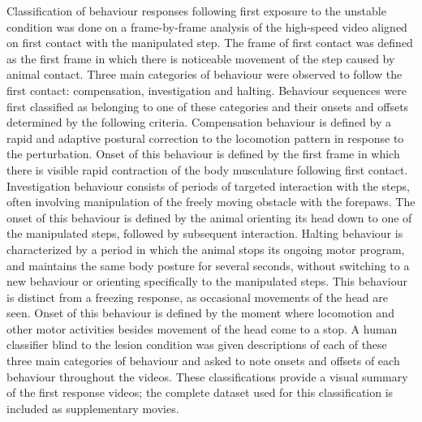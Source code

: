 Classification of behaviour responses following first exposure to the unstable condition was done on a frame-by-frame analysis of the high-speed video aligned on first contact with the manipulated step. The frame of first contact was defined as the first frame in which there is noticeable movement of the step caused by animal contact. Three main categories of behaviour were observed to follow the first contact: compensation, investigation and halting. Behaviour sequences were first classified as belonging to one of these categories and their onsets and offsets determined by the following criteria. Compensation behaviour is defined by a rapid and adaptive postural correction to the locomotion pattern in response to the perturbation. Onset of this behaviour is defined by the first frame in which there is visible rapid contraction of the body musculature following first contact. Investigation behaviour consists of periods of targeted interaction with the steps, often involving manipulation of the freely moving obstacle with the forepaws. The onset of this behaviour is defined by the animal orienting its head down to one of the manipulated steps, followed by subsequent interaction. Halting behaviour is characterized by a period in which the animal stops its ongoing motor program, and maintains the same body posture for several seconds, without switching to a new behaviour or orienting specifically to the manipulated steps. This behaviour is distinct from a freezing response, as occasional movements of the head are seen. Onset of this behaviour is defined by the moment where locomotion and other motor activities besides movement of the head come to a stop. A human classifier blind to the lesion condition was given descriptions of each of these three main categories of behaviour and asked to note onsets and offsets of each behaviour throughout the videos. These classifications provide a visual summary of the first response videos; the complete dataset used for this classification is included as supplementary movies.
